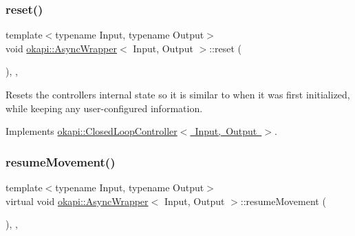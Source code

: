 \mbox{\label{classokapi_1_1AsyncWrapper_a9372a74580e5be429ecd65ec0e110c23}} 
\subsubsection{\texorpdfstring{reset()}{reset()}}
{\footnotesize\ttfamily template$<$typename Input, typename Output$>$ \\
void \mbox{\hyperlink{classokapi_1_1AsyncWrapper}{okapi\+::\+Async\+Wrapper}}$<$ Input, Output $>$\+::reset (\begin{DoxyParamCaption}{ }\end{DoxyParamCaption})\hspace{0.3cm}{\ttfamily [inline]}, {\ttfamily [override]}, {\ttfamily [virtual]}}

Resets the controller\textquotesingle{}s internal state so it is similar to when it was first initialized, while keeping any user-\/configured information. 

Implements \mbox{\hyperlink{classokapi_1_1ClosedLoopController_a7dd6ce28b3e38bdf987514a1b6c83c8c}{okapi\+::\+Closed\+Loop\+Controller$<$ Input, Output $>$}}.

\mbox{\label{classokapi_1_1AsyncWrapper_a67fa1bf10df9b8f3c280d8f2b136038a}} 
\subsubsection{\texorpdfstring{resumeMovement()}{resumeMovement()}}
{\footnotesize\ttfamily template$<$typename Input, typename Output$>$ \\
virtual void \mbox{\hyperlink{classokapi_1_1AsyncWrapper}{okapi\+::\+Async\+Wrapper}}$<$ Input, Output $>$\+::resume\+Movement (\begin{DoxyParamCaption}{ }\end{DoxyParamCaption})\hspace{0.3cm}{\ttfamily [inline]}, {\ttfamily [protected]}, {\ttfamily [virtual]}}

